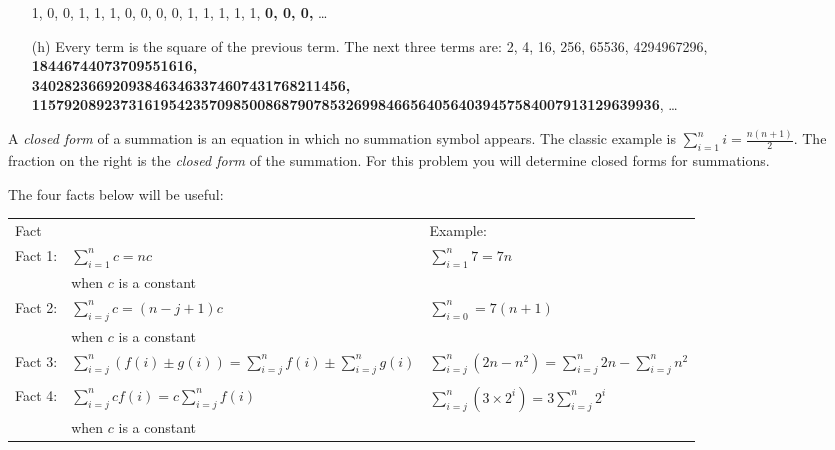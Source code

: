 \documentclass[12pt,addpoints]{exam}
\begin{document}
\begin{questions}
\begin{solution}
\begin{itemize}[topsep=0pt,parsep=0pt,itemsep=0pt]
    1, 0, 0, 1, 1, 1, 0, 0, 0, 0, 1, 1, 1, 1, 1, \textbf{0, 0, 0,} \ldots
    \item[(h)] Every term is the square of the previous term. The next three terms are:
    2, 4, 16, 256, 65536, 4294967296, \textbf{ 18446744073709551616,}\\ \textbf{340282366920938463463374607431768211456,}\\ \scriptsize\textbf{115792089237316195423570985008687907853269984665640564039457584007913129639936}, \normalsize\ldots

\end{itemize}
\end{solution}


\question A \textit{closed form} of a summation is an equation
in which no summation symbol appears.  The classic example is
$\displaystyle \sum_{i=1}^n i = \frac{n(n+1)}{2}$.  The fraction on
the right is the \textit{closed form} of the summation.  For this
problem you will determine closed forms for summations.

The four facts below will be useful:

\begin{tabular}{lll}
    \multicolumn{2}{l}{Fact} & Example: \\
  Fact 1: & $\displaystyle \sum_{i=1}^n c  = nc$     & $\displaystyle \sum_{i=1}^n 7 = 7n$ \\
    & when $c$ is a constant \\
  Fact 2: & $\displaystyle \sum_{i=j}^n c  = (n-j+1)c$  & $\displaystyle \sum_{i=0}^n = 7(n+1) $ \\
    & when $c$ is a constant \\
  Fact 3: & $\displaystyle \sum_{i=j}^n (f(i) \pm g(i)) = \sum_{i=j}^n f(i) \pm \sum_{i=j}^n g(i)$ \hspace{0.2in} &  $\displaystyle \sum_{i=j}^n (2n - n^2) = \sum_{i=j}^n 2n - \sum_{i=j}^n n^2 $ \\
    & \\
  Fact 4: & $\displaystyle \sum_{i=j}^n cf(i) = c \sum_{i=j}^n f(i)$  & $\displaystyle \sum_{i=j}^n (3 \times 2^i) = 3 \sum_{i=j}^n 2^i $ \\
   & when $c$ is a constant \\
\end{tabular}


\end{questions}
\end{document}
